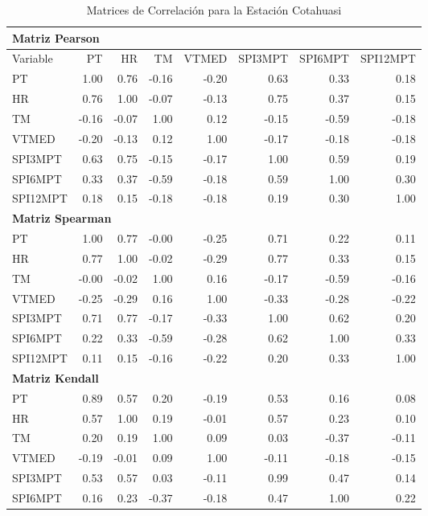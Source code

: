 \begin{table}[ht]
\centering
\caption{Matrices de Correlación para la Estación Cotahuasi}
\begin{tabular}{lrrrrrrr}
\toprule
\multicolumn{8}{l}{\textbf{Matriz Pearson}} \\
\midrule
Variable & PT & HR & TM & VTMED & SPI3MPT & SPI6MPT & SPI12MPT \\
\midrule
PT       & 1.00 & 0.76 & -0.16 & -0.20 & 0.63 & 0.33 & 0.18 \\
HR       & 0.76 & 1.00 & -0.07 & -0.13 & 0.75 & 0.37 & 0.15 \\
TM       & -0.16 & -0.07 & 1.00 & 0.12 & -0.15 & -0.59 & -0.18 \\
VTMED    & -0.20 & -0.13 & 0.12 & 1.00 & -0.17 & -0.18 & -0.18 \\
SPI3MPT  & 0.63 & 0.75 & -0.15 & -0.17 & 1.00 & 0.59 & 0.19 \\
SPI6MPT  & 0.33 & 0.37 & -0.59 & -0.18 & 0.59 & 1.00 & 0.30 \\
SPI12MPT & 0.18 & 0.15 & -0.18 & -0.18 & 0.19 & 0.30 & 1.00 \\
\midrule
\multicolumn{8}{l}{\textbf{Matriz Spearman}} \\
\midrule
PT       & 1.00 & 0.77 & -0.00 & -0.25 & 0.71 & 0.22 & 0.11 \\
HR       & 0.77 & 1.00 & -0.02 & -0.29 & 0.77 & 0.33 & 0.15 \\
TM       & -0.00 & -0.02 & 1.00 & 0.16 & -0.17 & -0.59 & -0.16 \\
VTMED    & -0.25 & -0.29 & 0.16 & 1.00 & -0.33 & -0.28 & -0.22 \\
SPI3MPT  & 0.71 & 0.77 & -0.17 & -0.33 & 1.00 & 0.62 & 0.20 \\
SPI6MPT  & 0.22 & 0.33 & -0.59 & -0.28 & 0.62 & 1.00 & 0.33 \\
SPI12MPT & 0.11 & 0.15 & -0.16 & -0.22 & 0.20 & 0.33 & 1.00 \\
\midrule
\multicolumn{8}{l}{\textbf{Matriz Kendall}} \\
\midrule
PT       & 0.89 & 0.57 & 0.20 & -0.19 & 0.53 & 0.16 & 0.08 \\
HR       & 0.57 & 1.00 & 0.19 & -0.01 & 0.57 & 0.23 & 0.10 \\
TM       & 0.20 & 0.19 & 1.00 & 0.09 & 0.03 & -0.37 & -0.11 \\
VTMED    & -0.19 & -0.01 & 0.09 & 1.00 & -0.11 & -0.18 & -0.15 \\
SPI3MPT  & 0.53 & 0.57 & 0.03 & -0.11 & 0.99 & 0.47 & 0.14 \\
SPI6MPT  & 0.16 & 0.23 & -0.37 & -0.18 & 0.47 & 1.00 & 0.22 \\

\end{tabular}
\end{table}
